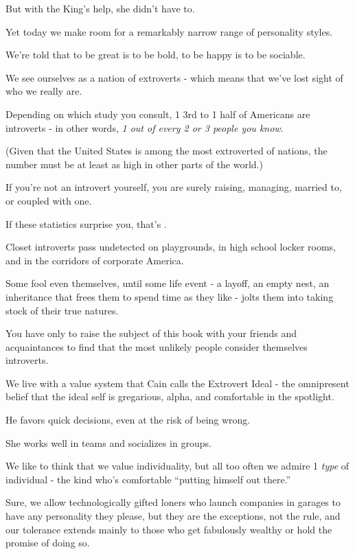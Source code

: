 \documentclass[oneside]{article}
\numberwithin{equation}{section}
\begin{document}
But with the King's help, she didn't have to.

%
Yet today we make room for a remarkably narrow range of personality styles.

We're told that to be great is to be bold, to be happy is to be sociable.

We see ourselves as a nation of extroverts - which means that we've lost sight of who we really are.

Depending on which study you consult, 1 3rd to 1 half of Americans are introverts - in other words, \textit{1 out of every 2 or 3 people you know}.

(Given that the United States is among the most extroverted of nations, the number must be at least as high in other parts of the world.)

If you're not an introvert yourself, you are surely raising, managing, married to, or coupled with one.

%
If these statistics surprise you, that's .

Closet introverts pass undetected on playgrounds, in high school locker rooms, and in the corridors of corporate America.

Some fool even themselves, until some life event - a layoff, an empty nest, an inheritance that frees them to spend time as they like - jolts them into taking stock of their true natures.

You have only to raise the subject of this book with your friends and acquaintances to find that the most unlikely people consider themselves introverts.

%

We live with a value system that Cain calls the Extrovert Ideal - the omnipresent belief that the ideal self is gregarious, alpha, and comfortable in the spotlight.


He favors quick decisions, even at the risk of being wrong.

She works well in teams and socializes in groups.

We like to think that we value individuality, but all too often we admire 1 \textit{type} of individual - the kind who's comfortable ``putting himself out there.''

Sure, we allow technologically gifted loners who launch companies in garages to have any personality they please, but they are the exceptions, not the rule, and our tolerance extends mainly to those who get fabulously wealthy or hold the promise of doing so.
\end{document}
